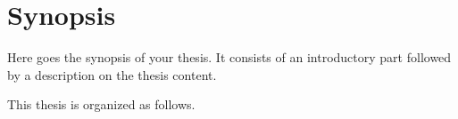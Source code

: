 
\chapter{Synopsis}
\label{ch:synopsis}

Here goes the synopsis of your thesis. It consists of an introductory part followed by a description on the thesis content. 

This thesis is organized as follows.